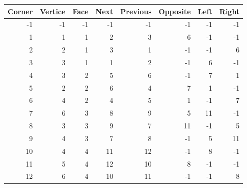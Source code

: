 \documentclass[a4paper]{article}
\begin{document}
 \begin{tabular}{rrrrrrrr}
 	\hline
 	Corner &   Vertice &   Face &   Next &   Previous &   Opposite &   Left &   Right \\
 	\hline
 	-1 &        -1 &     -1 &     -1 &         -1 &         -1 &     -1 &      -1 \\
 	1 &         1 &      1 &      2 &          3 &          6 &     -1 &      -1 \\
 	2 &         2 &      1 &      3 &          1 &         -1 &     -1 &       6 \\
 	3 &         3 &      1 &      1 &          2 &         -1 &      6 &      -1 \\
 	4 &         3 &      2 &      5 &          6 &         -1 &      7 &       1 \\
 	5 &         2 &      2 &      6 &          4 &          7 &      1 &      -1 \\
 	6 &         4 &      2 &      4 &          5 &          1 &     -1 &       7 \\
 	7 &         6 &      3 &      8 &          9 &          5 &     11 &      -1 \\
 	8 &         3 &      3 &      9 &          7 &         11 &     -1 &       5 \\
 	9 &         4 &      3 &      7 &          8 &         -1 &      5 &      11 \\
 	10 &         4 &      4 &     11 &         12 &         -1 &      8 &      -1 \\
 	11 &         5 &      4 &     12 &         10 &          8 &     -1 &      -1 \\
 	12 &         6 &      4 &     10 &         11 &         -1 &     -1 &       8 \\
 	\hline
 \end{tabular}
\end{document}
